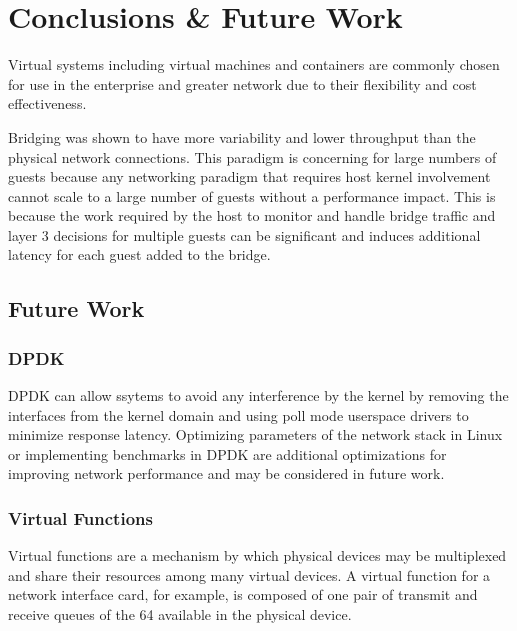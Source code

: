 \chapter{Conclusions \& Future Work}
\label{sec:conclusions}

Virtual systems including virtual machines and containers are commonly chosen for use in the enterprise and greater network due to their flexibility and cost effectiveness.

Bridging was shown to have more variability and lower throughput than the physical network connections.  
This paradigm is concerning for large numbers of guests because any networking paradigm that requires host kernel involvement cannot scale to a large number of guests without a performance impact.
This is because the work required by the host to monitor and handle bridge traffic and layer 3 decisions for multiple guests can be significant and induces additional latency for each guest added to the bridge.    

\section{Future Work}
\label{sec:future_work}
\subsection{DPDK}
DPDK can allow ssytems to avoid any interference by the kernel by removing the interfaces from the kernel domain and using poll mode userspace drivers to minimize response latency.  
Optimizing parameters of the network stack in Linux or implementing benchmarks in DPDK are additional optimizations for improving network performance and may be considered in future work.

\subsection{Virtual Functions}
\label{sec:virtual_functions}
Virtual functions are a mechanism by which physical devices may be multiplexed and share their resources among many virtual devices.  
A virtual function for a network interface card, for example, is composed of one pair of transmit and receive queues of the 64 available in the physical device.

